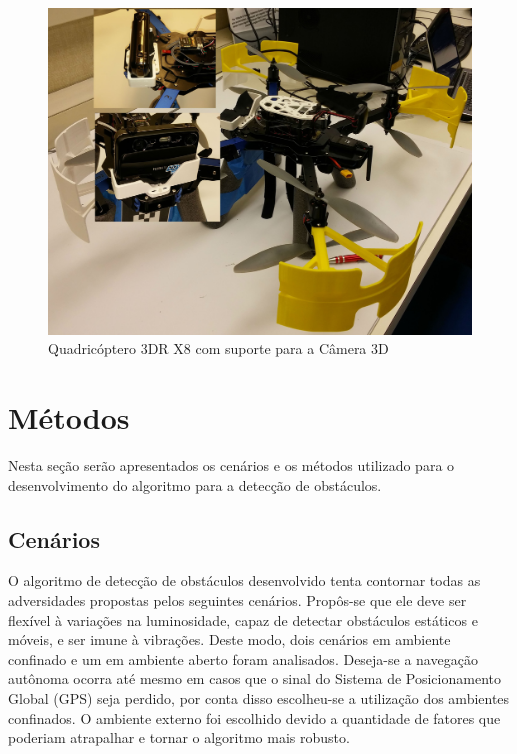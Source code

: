 \begin{figure}[H]
	\centering
	\includegraphics[scale=0.10]{./Resources/quad_camera_support.jpg}
	\caption{Quadricóptero 3DR X8 com suporte para a Câmera 3D}
	\label{quad_camera_support}
\end{figure}


\section{Métodos}

Nesta seção serão apresentados os cenários e os métodos utilizado para o desenvolvimento do algoritmo para a detecção de obstáculos.

\subsection{Cenários}

O algoritmo de detecção de obstáculos desenvolvido tenta contornar todas as adversidades propostas pelos seguintes cenários. Propôs-se que ele deve ser flexível à variações na luminosidade, capaz de detectar obstáculos estáticos e móveis, e ser imune à vibrações. Deste modo, dois cenários em ambiente confinado e um em ambiente aberto foram analisados. Deseja-se a navegação autônoma ocorra até mesmo em casos que o sinal do Sistema de Posicionamento Global (GPS) seja perdido, por conta disso escolheu-se a utilização dos ambientes confinados. O ambiente externo foi escolhido devido a quantidade de fatores que poderiam atrapalhar e tornar o algoritmo mais robusto.


